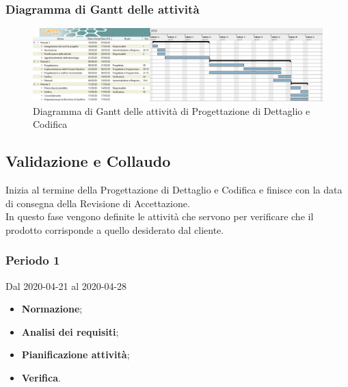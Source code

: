 \newpage
\begin{landscape}
	\subsubsection{Diagramma di Gantt delle attività}
	\pagestyle{empty}
	\begin{figure}[h]
			
		\begin{center}	
				\includegraphics[scale=0.5]{Sezioni/DiagrammiGantt/ProgettazioneDiDettaglio.png}	
		\end{center}
	\caption{Diagramma di Gantt delle attività di Progettazione di Dettaglio e Codifica}	
	\end{figure}
\end{landscape}

\subsection{Validazione e Collaudo}
Inizia al termine della Progettazione di Dettaglio e Codifica e finisce con la data di consegna della Revisione di Accettazione.
\\In questo fase vengono definite le attività che servono per verificare che il prodotto corrisponde a quello desiderato dal cliente.
\subsubsection{Periodo 1} 
Dal 2020-04-21 al 2020-04-28
\begin{itemize}
	\item \textbf{Normazione};
	\item \textbf{Analisi dei requisiti};
	\item \textbf{Pianificazione attività};
	\item \textbf{Verifica}.
\end{itemize}
